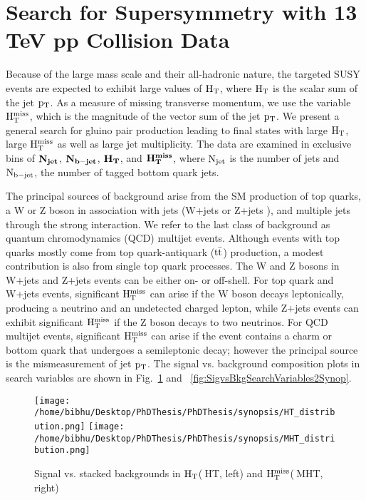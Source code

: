 \section{ Search for Supersymmetry with 13 TeV pp Collision Data}




Because of the large mass scale and their all-hadronic nature, the targeted SUSY events are expected to exhibit large values of $\rm H_{T}$,
where $\rm H_{T}$ is the scalar sum of the jet $\rm p_{T}$. As a measure of missing
transverse momentum, we use the variable $\rm H_{T}^{miss}$, which is the magnitude of the vector sum of
the jet $\rm p_{T}$. We present a general search for gluino pair production leading to final states with
large $\rm H_{T}$, large $\rm H_{T}^{miss}$ as well as large jet multiplicity. The data are examined in exclusive bins of $ \rm \bf{ N_{jet}}$, $ \rm \bf{ N_{b-jet}}$, $ \rm \bf{ H_{T}}$,
and $ \rm \bf{H_{T}^{miss}}$, where $\rm N_{jet}$ is the number of jets and $\rm N_{b-jet}$, the number of tagged bottom quark jets. 


The principal sources of background arise from the SM production of top quarks, a W or Z
boson in association with jets (W+jets or Z+jets ), and multiple jets through the strong
interaction. We refer to the last class of background as quantum chromodynamics (QCD)
multijet events. Although events with top quarks mostly come from top quark-antiquark ($\rm t\bar{t}$) production,
a modest contribution is also from single top quark processes. The W and Z bosons in W+jets and Z+jets events
can be either on- or off-shell. For top quark and W+jets events, significant $\rm H_{T}^{miss}$  can arise if the
W boson decays leptonically, producing a neutrino and an undetected charged lepton, while
Z+jets events can exhibit significant $\rm H_{T}^{miss}$ if the Z boson decays to two neutrinos. For QCD
multijet events, significant $\rm H_{T}^{miss}$ can arise if the event contains a charm or bottom quark that
undergoes a semileptonic decay; however the principal source is the mismeasurement of
jet $\rm p_{T}$. The signal vs. background composition plots in search variables are shown in Fig.~\ref{fig:SigvsBkgSearchVariables1Synop} and ~\ref{fig:SigvsBkgSearchVariables2Synop}.

\begin{figure}[h]
\begin{center}
\texttt{[image: /home/bibhu/Desktop/PhDThesis/PhDThesis/synopsis/HT\_distribution.png]}
\texttt{[image: /home/bibhu/Desktop/PhDThesis/PhDThesis/synopsis/MHT\_distribution.png]}
\caption{\label{fig:SigvsBkgSearchVariables1Synop} Signal vs. stacked backgrounds in $\rm H_{T}$($~$HT, left) and $\rm H_{T}^{miss}$($~$MHT, right)}
\end{center}
\end{figure}

